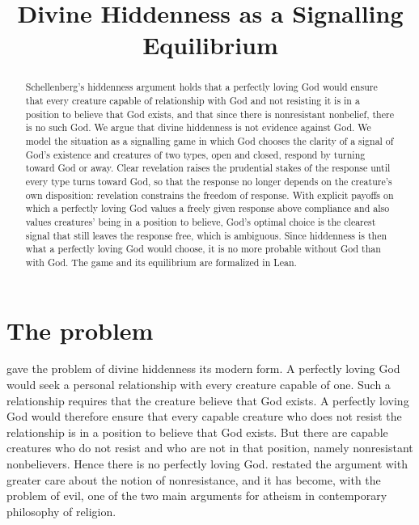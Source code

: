\documentclass{situationist-preprint}
\title{Divine Hiddenness as a Signalling Equilibrium}
\begin{document}
\maketitle

\begin{abstract}
Schellenberg's hiddenness argument holds that a perfectly loving God would ensure that every creature capable of relationship with God and not resisting it is in a position to believe that God exists, and that since there is nonresistant nonbelief, there is no such God. We argue that divine hiddenness is not evidence against God. We model the situation as a signalling game in which God chooses the clarity of a signal of God's existence and creatures of two types, open and closed, respond by turning toward God or away. Clear revelation raises the prudential stakes of the response until every type turns toward God, so that the response no longer depends on the creature's own disposition: revelation constrains the freedom of response. With explicit payoffs on which a perfectly loving God values a freely given response above compliance and also values creatures' being in a position to believe, God's optimal choice is the clearest signal that still leaves the response free, which is ambiguous. Since hiddenness is then what a perfectly loving God would choose, it is no more probable without God than with God. The game and its equilibrium are formalized in Lean.
\end{abstract}

\section{The problem}

\citet{Schellenberg1993} gave the problem of divine hiddenness its modern form. A perfectly loving God would seek a personal relationship with every creature capable of one. Such a relationship requires that the creature believe that God exists. A perfectly loving God would therefore ensure that every capable creature who does not resist the relationship is in a position to believe that God exists. But there are capable creatures who do not resist and who are not in that position, namely nonresistant nonbelievers. Hence there is no perfectly loving God. \citet{Schellenberg2015} restated the argument with greater care about the notion of nonresistance, and it has become, with the problem of evil, one of the two main arguments for atheism in contemporary philosophy of religion.
\end{document}
